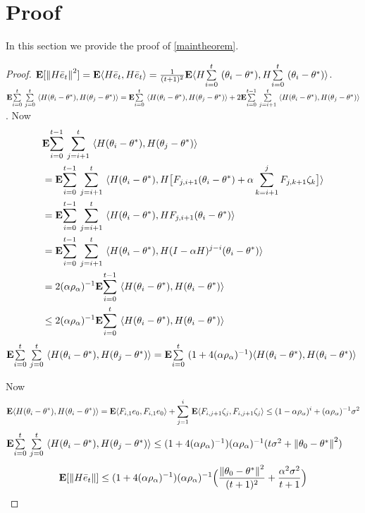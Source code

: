 \section{Proof}
\label{sec:proof}
In this section we provide the proof of \cref{maintheorem}.
\begin{proof}
$\E[\norm{H\eb_t}^2]=\E\ip{H\eb_t,H\eb_t}=\frac{1}{(t+1)^2}\E\ip{H\ous{\sum}{i=0}{t}(\theta_i-\ts),H\ous{\sum}{i=0}{t}(\theta_i-\ts)}$.
$\E\ous{\sum}{i=0}{t}\ous{\sum}{j=0}{t}\ip{H(\theta_i-\theta^*),H(\theta_j-\theta^*)}=\E\ous{\sum}{i=0}{t}\ip{H(\theta_i-\theta^*),H(\theta_j-\theta^*)}+ 2\E\ous{\sum}{i=0}{t-1}\ous{\sum}{j=i+1}{t}\ip{H(\theta_i-\theta^*),H(\theta_j-\theta^*)}$. Now
\begin{align}\label{inter}
&\E\ous{\sum}{i=0}{t-1}\ous{\sum}{j=i+1}{t}\ip{H(\theta_i-\theta^*),H(\theta_j-\theta^*)}\nn\\
&=\E\ous{\sum}{i=0}{t-1}\ous{\sum}{j=i+1}{t}\ip{H(\theta_i-\theta^*),H\big[F_{j,i+1} (\theta_i-\theta^*)+\alpha\sum_{k=i+1}^j F_{j,k+1}\zeta_{k}\big]}\nn\\
&=\E\ous{\sum}{i=0}{t-1}\ous{\sum}{j=i+1}{t}\ip{H(\theta_i-\theta^*),H F_{j,i+1} (\theta_i-\theta^*)}\nn\\
&=\E\ous{\sum}{i=0}{t-1}\ous{\sum}{j=i+1}{t}\ip{H(\theta_i-\theta^*),H(I-\alpha H)^{j-i} (\theta_i-\theta^*)}\nn\\
&=2(\alpha\rho_{\alpha})^{-1}\E\ous{\sum}{i=0}{t-1}\ip{H(\theta_i-\theta^*),H (\theta_i-\theta^*)}\nn\\
&\leq2(\alpha\rho_{\alpha})^{-1}\E\ous{\sum}{i=0}{t}\ip{H(\theta_i-\theta^*),H (\theta_i-\theta^*)}\nn\\
\end{align}
 $\E\ous{\sum}{i=0}{t}\ous{\sum}{j=0}{t}\ip{H(\theta_i-\theta^*),H(\theta_j-\theta^*)}=\E\ous{\sum}{i=0}{t}(1+4(\alpha\rho_{\alpha})^{-1})\ip{H(\theta_i-\theta^*),H(\theta_i-\theta^*)}
$

Now
\begin{align*}
\E\ip{H(\theta_i-\theta^*),H(\theta_i-\theta^*)}=\E\ip{F_{i,1}e_0,F_{i,1}e_0}+\ous{\sum}{j=1}{i}\E\ip{F_{i,j+1}\zeta_j,F_{i,j+1}\zeta_j}
\leq (1-\alpha\rho_{\alpha})^i+ (\alpha\rho_{\alpha})^{-1}\sigma^2
\end{align*}
$\E\ous{\sum}{i=0}{t}\ous{\sum}{j=0}{t}\ip{H(\theta_i-\theta^*),H(\theta_j-\theta^*)}\leq (1+4(\alpha\rho_{\alpha})^{-1}) (\alpha\rho_{\alpha})^{-1}(t\sigma^2+\norm{\theta_0-\ts}^2)$
\begin{align}
\E[\norm{H\eb_t}]\leq (1+4(\alpha\rho_{\alpha})^{-1}) (\alpha\rho_{\alpha})^{-1} \Big(\frac{\norm{\theta_0-\ts}^2}{(t+1)^2}+ \frac{\alpha^2\sigma^2}{t+1} \Big)
\end{align}
\end{proof}

